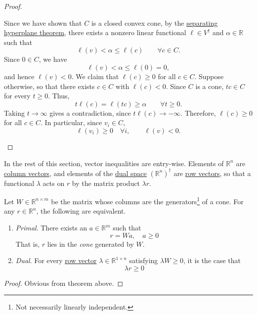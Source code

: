 \begin{proof}
\begin{enumerate}
				Since we have shown that $C$ is a closed convex cone, by the \hyperref[thm:separating-hyperplane-theorem]{separating hyperplane theorem}, there exists a nonzero linear functional $\ell \in V^\dagger$ and $\alpha \in \mathbb{R}$ such that
				\begin{equation}
					\ell(v) < \alpha \leq \ell(c)
					\qquad \forall c \in C.
				\end{equation}
				Since $0 \in C$, we have
				\begin{equation}
					\ell(v) < \alpha \leq \ell(0) = 0,
				\end{equation}
				and hence $\ell(v) < 0$. We claim that $\ell(c) \geq 0$ for all $c \in C$. Suppose otherwise, so that there exists $c \in C$ with $\ell(c) < 0$. Since $C$ is a cone, $tc \in C$ for every $t \geq 0$. Thus,
				\begin{equation}
					t\ell(c) = \ell(tc) \geq \alpha
					\qquad \forall t \geq 0.
				\end{equation}
				Taking $t \to \infty$ gives a contradiction, since $t\ell(c) \to -\infty$. Therefore, $\ell(c) \geq 0$ for all $c \in C$. In particular, since $v_i \in C$,
				\begin{equation}
					\ell(v_i) \geq 0 \quad \forall i,
					\qquad \ell(v) < 0.
				\end{equation}

		\end{enumerate}
	\end{proof}

  In the rest of this section, vector inequalities are entry-wise. Elements of $\mathbb{R}^n$ are \hyperref[lin-def:column-vector]{column vectors}, and elements of the \hyperref[lin-def:dual-space]{dual space} $(\mathbb{R}^n)^\dagger$ are \hyperref[lin-def:row-vector]{row vectors}, so that a functional $\lambda$ acts on $r$ by the matrix product $\lambda r$.

	\begin{corollary}
	  \label{thm:farkas-lemma-equality-form}
		Let $W \in \mathbb{R}^{n \times m}$ be the matrix whose columns are the generators\footnote{Not necessarily linearly independent.} of a cone. For any $r \in \mathbb{R}^n$, the following are equivalent. 
		\begin{enumerate}
			\item \textit{Primal}. There exists an $a \in \mathbb{R}^m$ such that 
				\begin{equation}
				  r = Wa, \quad a \geq 0
				\end{equation} 
				That is, $r$ lies in the \textit{cone} generated by $W$. 

			\item \textit{Dual}. For every \hyperref[lin-def:row-vector]{row vector} $\lambda \in \mathbb{R}^{1 \times n}$ satisfying $\lambda W \geq 0$, it is the case that 
				\begin{equation}
					\lambda r \geq 0
				\end{equation}
		\end{enumerate}
  \end{corollary}
	\begin{proof}
	  Obvious from theorem above. 
	\end{proof}

